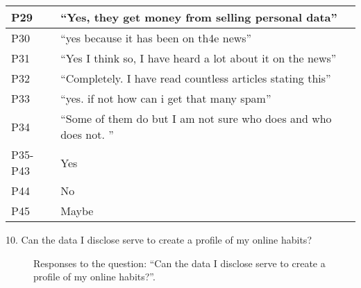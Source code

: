 \begin{longtable}{p{3cm} p{13cm}}
    \hline
    P29 & ``Yes, they get money from selling personal data'' \\
    \hline
    P30 & ``yes because it has been on th4e news'' \\
    \hline
    P31 & ``Yes I think so, I have heard a lot about it on the news'' \\
    \hline
    P32 & ``Completely. I have read countless articles stating this'' \\
    \hline
    P33 & ``yes. if not how can i get that many spam'' \\
    \hline
    P34 & ``Some of them do but I am not sure who does and who does not. '' \\
    \hline
    P35-P43 & Yes \\
    \hline
    P44 & No \\
    \hline
    P45 & Maybe \\
    \hline
\end{longtable}

\vspace{2cm}

10. Can the data I disclose serve to create a profile of my online habits?

\begin{figure}[H]
    \begin{center}
        \caption*{Responses to the question: ``Can the data I disclose serve to create a profile of my online habits?''.}
        \label{fig:survey_s5_q10}
    \end{center}
\end{figure}

\clearpage

